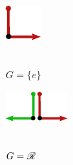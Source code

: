 \begin{figure}
    \hspace*{.5ex}
    \begin{subfigure}[b]{0.105\textwidth}
        \centering
        \includegraphics[width=.66\textwidth]{figures/GpM_trivial.pdf}
        \\~\vspace*{-2pt}
        \caption{\small
            $G=\{e\}$
        }
        \label{fig:GpM_a}
    \end{subfigure}
    \hspace*{.5ex}
    \begin{subfigure}[b]{0.14\textwidth}
        \centering
        \includegraphics[width=1.\textwidth]{figures/GpM_reflect.pdf}
        \\~\vspace*{-2pt}
        \caption{\small
            $G=\mathscr{R}$
        }
        \label{fig:GpM_b}
    \end{subfigure}
    \hspace*{.5ex}
    \begin{subfigure}[b]{0.14\textwidth}
        \centering

\end{subfigure}
\end{figure}
